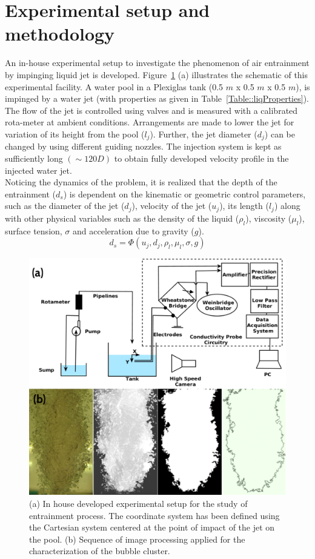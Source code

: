 \section{Experimental setup and methodology}
An in-house experimental setup to investigate the phenomenon of air entrainment by impinging liquid jet is developed. Figure~\ref{Fig::setup} (a) illustrates the schematic of this experimental facility. A water pool in a Plexiglas tank (0.5 $m$ x 0.5 $m$ x 0.5 $m$), is impinged by a water jet (with properties as given in Table~\ref{Table::liqProperties}). The flow of the jet is controlled using valves and is measured with a calibrated rota-meter at ambient conditions. Arrangements are made to lower the jet for variation of its height from the pool ($l_j$). Further, the jet diameter ($d_j$) can be changed by using different guiding nozzles. The injection system is kept as sufficiently long $(\sim 120D)$ to obtain fully developed velocity profile in the injected water jet. \\
Noticing the dynamics of the problem, it is realized that the depth of the entrainment ($d_s$) is dependent on the kinematic or geometric control parameters, such as the diameter of the jet ($d_j$), velocity of the jet ($u_j$), its length ($l_j$) along with other physical variables such as the density of the liquid ($\rho_l$), viscosity ($\mu_l$), surface tension, $\sigma$ and acceleration due to gravity ($g$). 
\begin{equation}
d_s = \Phi(u_j, d_j, \rho_l, \mu_l, \sigma, g) 
\label{Equation::params}
\end{equation}
\begin{figure}
	\centering
	\includegraphics[width = 0.95\linewidth]{chapters/jetPool/Figure1}
	\caption{(a) In house developed experimental setup for the study of entrainment process. The coordinate system has been defined using the Cartesian system centered at the point of impact of the jet on the pool. (b) Sequence of image processing applied for the characterization of the bubble cluster.}
	\label{Fig::setup}
\end{figure}

